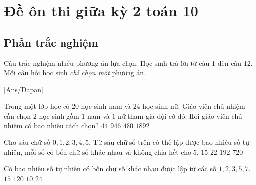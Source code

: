 \section{Đề ôn thi giữa kỳ 2 toán 10}
\subsection{Phần trắc nghiệm}
Câu trắc nghiệm nhiều phương án lựa chọn. Học sinh trả lời từ
câu 1 đến câu 12. Mỗi câu hỏi học sinh \textit{chỉ chọn một} phương án.

[Ans/Dapan]
 
\hienthiloigiaiex
\begin{ex}%
	Trong một lớp học có $20$ học sinh nam và $24$ học sinh nữ. Giáo viên chủ nhiệm cần chọn $2$ học sinh gồm $1$ nam và $1$ nữ tham gia đội cờ đỏ. Hỏi giáo viên chủ nhiệm có bao nhiêu cách chọn?
	\choice
	{$44$}
	{$946$}
	{\True $480$}
	{$1892$}
\end{ex}
\begin{ex}%
	Cho sáu chữ số $0,1,2,3,4,5$. Từ sáu chữ số trên có thể lập được bao nhiêu số tự nhiên, mỗi số có bốn chữ số khác nhau và không chia hết cho $5$.
	\choice
	{$15$}
	{$22$}
	{\True $192$}
	{$720$}
\end{ex}
\begin{ex}%
	Có bao nhiêu số tự nhiên có bốn chữ số khác nhau được lập từ các số $1,2,3,5,7$.
	\choice
	{$15$}
	{\True $120$}
	{$10$}
	{$24$}
\end{ex}
